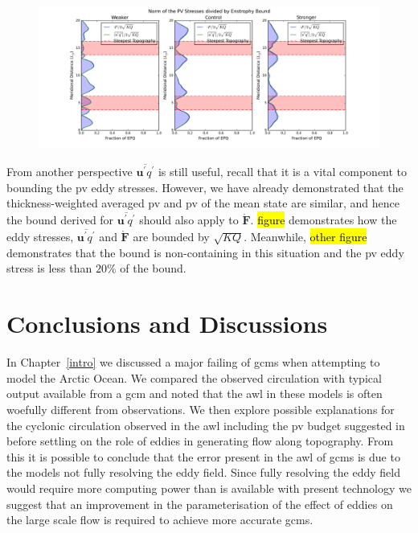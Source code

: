 \documentclass[12pt,a4paper]{report}
\newcommand*\thkmean[1]{\overline{#1}}
\newcommand*\thkres[1]{{#1}^{\prime}}
\newcommand*\spec[1]{\mathring{#1}}
\begin{document}
   \begin{figure}
   	\centering
   	\includegraphics[width=\linewidth]{normoverepq_0_3}
   	\caption{ }
   \end{figure}
   
   From another perspective $\thkmean{\thkres{\boldsymbol{u}}\thkres{q}}$ is still useful,
   recall that it is a vital component to bounding the \gls{pv} eddy stresses.
   However, we have already demonstrated that the thickness-weighted averaged 
   \gls{pv} and \gls{pv} of the mean state are similar, and hence the bound 
   derived for  $\thkmean{\thkres{\boldsymbol{u}}\thkres{q}}$ should also apply to $\boldsymbol{\spec{F}}$. 
   \hl{figure} demonstrates how the
   eddy stresses, $\thkmean{\thkres{\boldsymbol{u}}\thkres{q}}$ and $\boldsymbol{\spec{F}}$
   are bounded by $\sqrt{KQ}$. Meanwhile, \hl{other figure} demonstrates that the bound
   is non-containing in this situation and the \gls{pv} eddy stress is less than
   $20\%$ of the bound.  
   

\chapter{Conclusions and Discussions}
\label{summary}

In Chapter~\ref{intro} we discussed a major failing of \glspl{gcm} when attempting to model
the Arctic Ocean. We compared the observed circulation with typical output available 
from a \gls{gcm} and noted that the \gls{awl} in these models is often woefully 
different from observations. We then explore possible explanations for the cyclonic 
circulation observed in the  \gls{awl} including the \gls{pv} budget suggested in
\cite{yang2005arctic} before settling on the role of eddies in generating flow along
topography. From this it is possible to conclude that the error present in the \gls{awl} of \glspl{gcm} is due to the models not fully resolving the eddy field. Since fully
resolving the eddy field would require more computing power than is available with 
present technology we suggest that an improvement in the parameterisation of the effect
of eddies on the large scale flow
is required to achieve more accurate \glspl{gcm}.
\end{document}
